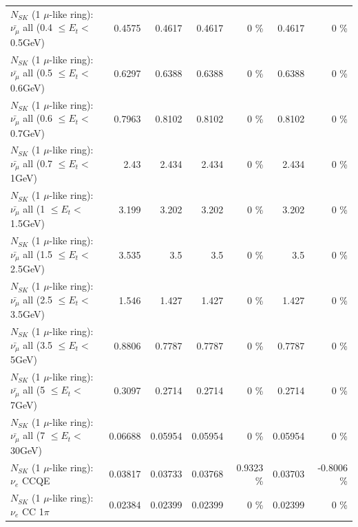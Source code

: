 \begin{table}
\begin{tabular}{| l | r | r | r  r | r  r |}
 $N_{SK}$ (1 $\mu$-like ring): $\bar{\nu_{\mu}}$ all (0.4 $\leq E_{t} <$ 0.5GeV) &          0.4575 &          0.4617 &          0.4617 &        0 \%  &          0.4617 &        0 \%  \\ 
 $N_{SK}$ (1 $\mu$-like ring): $\bar{\nu_{\mu}}$ all (0.5 $\leq E_{t} <$ 0.6GeV) &          0.6297 &          0.6388 &          0.6388 &        0 \%  &          0.6388 &        0 \%  \\ 
 $N_{SK}$ (1 $\mu$-like ring): $\bar{\nu_{\mu}}$ all (0.6 $\leq E_{t} <$ 0.7GeV) &          0.7963 &          0.8102 &          0.8102 &        0 \%  &          0.8102 &        0 \%  \\ 
   $N_{SK}$ (1 $\mu$-like ring): $\bar{\nu_{\mu}}$ all (0.7 $\leq E_{t} <$ 1GeV) &            2.43 &           2.434 &           2.434 &        0 \%  &           2.434 &        0 \%  \\ 
   $N_{SK}$ (1 $\mu$-like ring): $\bar{\nu_{\mu}}$ all (1 $\leq E_{t} <$ 1.5GeV) &           3.199 &           3.202 &           3.202 &        0 \%  &           3.202 &        0 \%  \\ 
 $N_{SK}$ (1 $\mu$-like ring): $\bar{\nu_{\mu}}$ all (1.5 $\leq E_{t} <$ 2.5GeV) &           3.535 &             3.5 &             3.5 &        0 \%  &             3.5 &        0 \%  \\ 
 $N_{SK}$ (1 $\mu$-like ring): $\bar{\nu_{\mu}}$ all (2.5 $\leq E_{t} <$ 3.5GeV) &           1.546 &           1.427 &           1.427 &        0 \%  &           1.427 &        0 \%  \\ 
   $N_{SK}$ (1 $\mu$-like ring): $\bar{\nu_{\mu}}$ all (3.5 $\leq E_{t} <$ 5GeV) &          0.8806 &          0.7787 &          0.7787 &        0 \%  &          0.7787 &        0 \%  \\ 
     $N_{SK}$ (1 $\mu$-like ring): $\bar{\nu_{\mu}}$ all (5 $\leq E_{t} <$ 7GeV) &          0.3097 &          0.2714 &          0.2714 &        0 \%  &          0.2714 &        0 \%  \\ 
    $N_{SK}$ (1 $\mu$-like ring): $\bar{\nu_{\mu}}$ all (7 $\leq E_{t} <$ 30GeV) &         0.06688 &         0.05954 &         0.05954 &        0 \%  &         0.05954 &        0 \%  \\ 
\hline
\hline
\hline
                                      $N_{SK}$ (1 $\mu$-like ring): $\nu_e$ CCQE &         0.03817 &         0.03733 &         0.03768 &   0.9323 \%  &         0.03703 &  -0.8006 \%  \\ 
                                 $N_{SK}$ (1 $\mu$-like ring): $\nu_e$ CC 1$\pi$ &         0.02384 &         0.02399 &         0.02399 &        0 \%  &         0.02399 &        0 \%  \\ 

\end{tabular}
\end{table}
